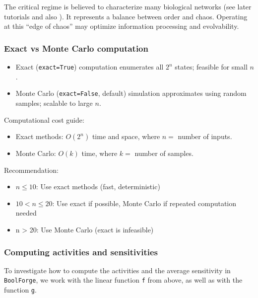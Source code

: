 \documentclass[
]{article}
\providecommand{\tightlist}{%
  \setlength{\itemsep}{0pt}\setlength{\parskip}{0pt}}
\begin{document}
The critical regime is believed to characterize many biological networks
(see later tutorials and also \citet{daniels2018criticality}). It
represents a balance between order and chaos. Operating at this ``edge
of chaos'' may optimize information processing and evolvability.

\subsubsection{Exact vs Monte Carlo
computation}\label{exact-vs-monte-carlo-computation}

\begin{itemize}
\tightlist
\item
  Exact (\texttt{exact=True}) computation enumerates all \(2^n\) states;
  feasible for small \(n\).
\item
  Monte Carlo (\texttt{exact=False}, default) simulation approximates
  using random samples; scalable to large \(n\).
\end{itemize}

Computational cost guide:

\begin{itemize}
\tightlist
\item
  Exact methods: \(O(2^n)\) time and space, where \(n =\) number of
  inputs.
\item
  Monte Carlo: \(O(k)\) time, where \(k =\) number of samples.
\end{itemize}

Recommendation:

\begin{itemize}
\tightlist
\item
  \(n \leq 10\): Use exact methods (fast, deterministic)
\item
  \(10 < n \leq 20\): Use exact if possible, Monte Carlo if repeated
  computation needed
\item
  n \textgreater{} 20: Use Monte Carlo (exact is infeasible)
\end{itemize}

\subsubsection{Computing activities and
sensitivities}\label{computing-activities-and-sensitivities}

To investigate how to compute the activities and the average sensitivity
in \texttt{BoolForge}, we work with the linear function \texttt{f} from
above, as well as with the function \texttt{g}.
\end{document}
